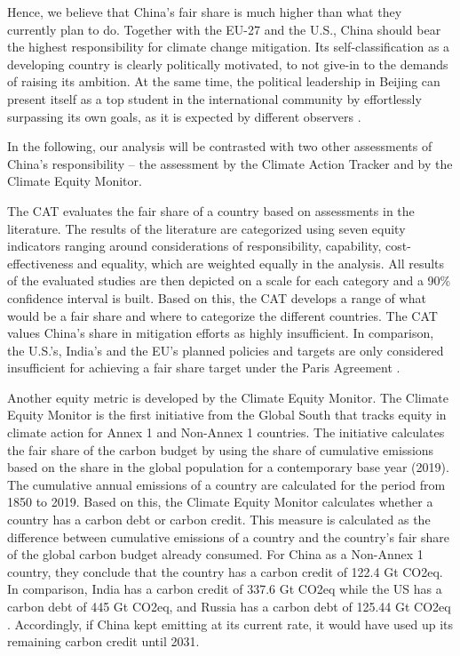 \documentclass[
  12pt,
]{article}
\numberwithin{equation}{section}
\numberwithin{table}{section}
\numberwithin{figure}{section}
\begin{document}
Hence, we believe that China's fair share is much higher than what they
currently plan to do. Together with the EU-27 and the U.S., China should
bear the highest responsibility for climate change mitigation. Its
self-classification as a developing country is clearly politically
motivated, to not give-in to the demands of raising its ambition. At the
same time, the political leadership in Beijing can present itself as a
top student in the international community by effortlessly surpassing
its own goals, as it is expected by different observers \citep{CAT2022}.

In the following, our analysis will be contrasted with two other
assessments of China's responsibility -- the assessment by the Climate
Action Tracker and by the Climate Equity Monitor.

The CAT evaluates the fair share of a country based on assessments in
the literature. The results of the literature are categorized using
seven equity indicators ranging around considerations of responsibility,
capability, cost-effectiveness and equality, which are weighted equally
in the analysis. All results of the evaluated studies are then depicted
on a scale for each category and a 90\% confidence interval is built.
Based on this, the CAT develops a range of what would be a fair share
and where to categorize the different countries. The CAT values China's
share in mitigation efforts as highly insufficient. In comparison, the
U.S.'s, India's and the EU's planned policies and targets are only
considered insufficient for achieving a fair share target under the
Paris Agreement \citep{CAT2022}.

Another equity metric is developed by the Climate Equity Monitor. The
Climate Equity Monitor is the first initiative from the Global South
that tracks equity in climate action for Annex 1 and Non-Annex 1
countries. The initiative calculates the fair share of the carbon budget
by using the share of cumulative emissions based on the share in the
global population for a contemporary base year (2019). The cumulative
annual emissions of a country are calculated for the period from 1850 to
2019. Based on this, the Climate Equity Monitor calculates whether a
country has a carbon debt or carbon credit. This measure is calculated
as the difference between cumulative emissions of a country and the
country's fair share of the global carbon budget already consumed. For
China as a Non-Annex 1 country, they conclude that the country has a
carbon credit of 122.4 Gt CO2eq. In comparison, India has a carbon
credit of 337.6 Gt CO2eq while the US has a carbon debt of 445 Gt CO2eq,
and Russia has a carbon debt of 125.44 Gt CO2eq \citep{CEM2022}.
Accordingly, if China kept emitting at its current rate, it would have
used up its remaining carbon credit until 2031.
\end{document}

